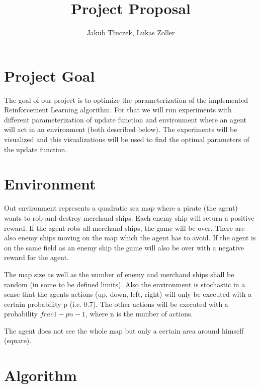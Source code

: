 \documentclass[11pt]{article} %
\title{Project Proposal}
\author{Jakub Tłuczek, Lukas Zoller}
\begin{document}
\maketitle

\section{Project Goal}
The goal of our project is to optimize the parameterization of the implemented Reinforcement Learning algorithm. For that we will run experiments with different parameterization of update function and environment where an agent will act in an environment (both described below). The experiments will be visualized and this visualizations will be used to find the optimal parameters of the update function.

\section{Environment}
Out environment represents a quadratic sea map where a pirate (the agent) wants to rob and destroy merchand ships. Each enemy ship will return a positive reward. If the agent robs all merchand ships, the game will be over. There are also enemy ships moving on the map which the agent has to avoid. If the agent is on the same field as an enemy ship the game will also be over with a negative reward for the agent.

The map size as well as the number of enemy and merchand ships shall be random (in some to be defined limits). Also the environment is stochastic in a sense that the agents actions (up, down, left, right) will only be executed with a certain probability p (i.e. 0.7). The other actions will be executed with a probability $frac{1-p}{n-1}$, where n is the number of actions. 

The agent does not see the whole map but only a certain area around himself (square). 

\section{Algorithm}
\end{document}
